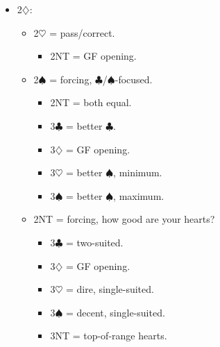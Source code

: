 \documentclass[a4paper,12pt]{article}
\begin{document}
\begin{itemize}
\item 2$\diamondsuit$:
	\begin{itemize}
   \item 2$\heartsuit$ = pass/correct.
		\begin{itemize}
      \item 2NT = GF opening.
		\end{itemize}
   \item 2$\spadesuit$ = forcing, $\clubsuit$/$\spadesuit$-focused.
		\begin{itemize}
      \item 2NT = both equal.
      \item 3$\clubsuit$ = better $\clubsuit$.
      \item 3$\diamondsuit$ = GF opening.
      \item 3$\heartsuit$ = better $\spadesuit$, minimum.
      \item 3$\spadesuit$ = better $\spadesuit$, maximum.
		\end{itemize}
   \item 2NT = forcing, how good are your hearts?
		\begin{itemize}
      \item 3$\clubsuit$ = two-suited.
      \item 3$\diamondsuit$ = GF opening.
      \item 3$\heartsuit$ = dire, single-suited.
      \item 3$\spadesuit$ = decent, single-suited.
      \item 3NT = top-of-range hearts.
		\end{itemize}
	\end{itemize}


\end{itemize}
\end{document}
